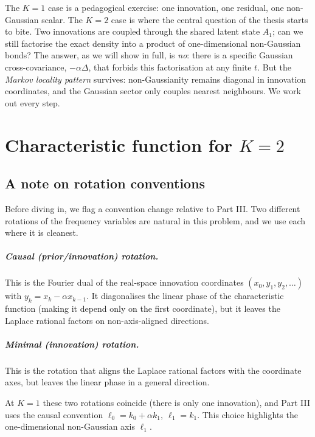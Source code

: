 \documentclass[11pt,a4paper,openany]{book}
\theoremstyle{plainserif}
\theoremstyle{definition}
\theoremstyle{remarkstyle}
\begin{document}
The $K=1$ case is a pedagogical exercise: one innovation, one residual,
one non-Gaussian scalar. The $K=2$ case is where the central question of
the thesis starts to bite. Two innovations are coupled through the
shared latent state $A_1$; can we still factorise the exact density into
a product of one-dimensional non-Gaussian bonds? The answer, as we will
show in full, is \emph{no}: there is a specific Gaussian
cross-covariance, $-\alpha\Delta$, that forbids this factorisation at
any finite $t$. But the \emph{Markov locality pattern} survives:
non-Gaussianity remains diagonal in innovation coordinates, and the
Gaussian sector only couples nearest neighbours. We work out every step.

\chapter{Characteristic function for $K{=}2$}
\label{ch:K2-fourier}

\section*{A note on rotation conventions}

Before diving in, we flag a convention change relative to Part III.
Two different rotations of the frequency variables are natural in this
problem, and we use each where it is cleanest.

\paragraph{Causal (prior/innovation) rotation.} This is the Fourier dual
of the real-space innovation coordinates
$(x_0, y_1, y_2, \ldots)$ with $y_k = x_k - \alpha x_{k-1}$.
It diagonalises the linear phase of the characteristic function
(making it depend only on the first coordinate), but it leaves the
Laplace rational factors on non-axis-aligned directions.

\paragraph{Minimal (innovation) rotation.}
This is the rotation that aligns the Laplace rational factors with the
coordinate axes, but leaves the linear phase in a general direction.

\medskip

At $K=1$ these two rotations coincide (there is only one innovation),
and Part III uses the causal convention
$\ell_0 = k_0 + \alpha k_1,\ \ell_1 = k_1$. This choice highlights the
one-dimensional non-Gaussian axis $\ell_1$.
\end{document}
